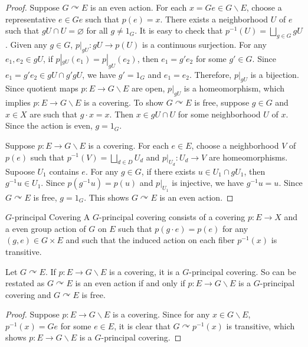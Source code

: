 \documentclass{report}
\def\acts{\curvearrowright}
\begin{document}
\begin{proof}
	Suppose $G \acts E$ is an even action. For each $x=Ge \in G \backslash E$, choose a representative $e \in Ge$ such that $p(e)=x$. There exists a neighborhood $U$ of $e$ such that $gU \cap U = \varnothing$ for all $g \neq 1_G$. It is easy to check that $p^{-1}(U)=\bigsqcup_{g\in G} gU$. Given any $g\in G$, $p|_{gU}: gU \to p(U)$ is a continuous surjection. For any $e_1,e_2\in gU$, if $p|_{gU}(e_1)=p|_{gU}(e_2)$, then $e_1=g'e_2$ for some $g'\in G$. Since $e_1=g'e_2\in gU \cap g'gU$, we have $g'=1_G$ and $e_1=e_2$. Therefore, $p|_{gU}$ is a bijection. Since quotient maps $p: E\to G\backslash E$ are open, $p|_{gU}$ is a homeomorphism, which implies $p: E\to G\backslash E$ is a covering. To show $G \acts E$ is free, suppose $g \in G$ and $x \in X$ are such that $g \cdot x=x$. Then $x \in g U \cap U$ for some neighborhood $U$ of $x$. Since the action is even, $g=1_G$.

	Suppose $p: E\to G\backslash E$ is a covering. For each $e\in E$, choose a neighborhood $V$ of $p(e)$ such that $p^{-1}\left(V\right)=\bigsqcup_{d\in D} U_d$ and $p|_{U_d}: U_d\to V$ are homeomorphisms. Supoose $U_1$ contains $e$. For any $g\in G$, if there exists $u \in U_1 \cap gU_1$, then $g^{-1}u \in U_1$. Since $p(g^{-1}u)=p(u)$ and $p|_{U_1}$ is injective, we have $g^{-1}u=u$. Since $G \acts E$ is free, $g=1_G$. This shows $G \acts E$ is an even action.
\end{proof}


\begin{definition}{$G$-principal Covering}{}
	A $G$-principal covering consists of a covering $p: E \rightarrow X$ and a even group action of $G$ on $E$ such that $p(g \cdot e)=p(e)$ for any $(g, e) \in G \times E$ and such that the induced action on each fiber $p^{-1}(x)$ is transitive.
\end{definition}
\begin{proposition}{}{}
	Let $G\acts E$. If $p: E\to G\backslash E$ is a covering, it is a $G$-principal covering. So  can be restated as $G \acts E$ is an even action if and only if $p: E\to G\backslash E$ is a $G$-principal covering and $G \acts E$ is free.
\end{proposition}
\begin{proof}
	Suppose $p: E\to G\backslash E$ is a covering. Since for any $x\in G \backslash E$, $p^{-1}(x)=Ge$ for some $e\in E$, it is clear that $G \acts p^{-1}(x)$ is transitive, which shows $p: E\to G\backslash E$ is a $G$-principal covering.
\end{proof}
\end{document}
